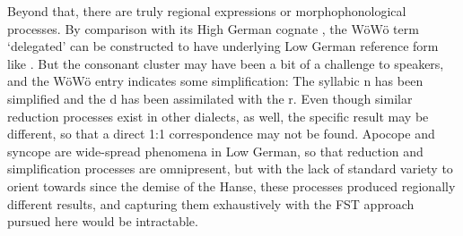 Beyond that, there are truly regional expressions or morphophonological processes. By comparison with its High German cognate , the WöWö term  `delegated' can be constructed to have underlying Low German reference form like . But the consonant cluster  may have been a bit of a challenge to speakers, and the WöWö entry indicates some simplification: The syllabic n has been simplified and the d has been assimilated with the r. Even though similar reduction processes exist in other dialects, as well, the specific result may be different, so that a direct 1:1 correspondence may not be found. Apocope and syncope are wide-spread phenomena in Low German, so that reduction and simplification processes are omnipresent, but with the lack of standard variety to orient towards since the demise of the Hanse, these processes produced regionally different results, and capturing them exhaustively with the FST approach pursued here would be intractable.
